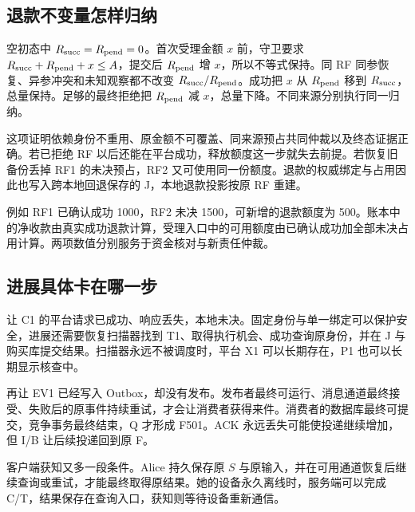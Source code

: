 \subsection*{退款不变量怎样归纳}

空初态中 $R_{\rm succ}=R_{\rm pend}=0$。首次受理金额 $x$ 前，守卫要求 $R_{\rm succ}+R_{\rm pend}+x\le A$，提交后 $R_{\rm pend}$ 增 $x$，所以不等式保持。同 RF 同参恢复、异参冲突和未知观察都不改变 $R_{\rm succ}/R_{\rm pend}$。成功把 $x$ 从 $R_{\rm pend}$ 移到 $R_{\rm succ}$，总量保持。足够的最终拒绝把 $R_{\rm pend}$ 减 $x$，总量下降。不同来源分别执行同一归纳。

这项证明依赖身份不重用、原金额不可覆盖、同来源预占共同仲裁以及终态证据正确。若已拒绝 RF 以后还能在平台成功，释放额度这一步就失去前提。若恢复旧备份丢掉 RF1 的未决预占，RF2 又可使用同一份额度。退款的权威绑定与占用因此也写入跨本地回退保存的 J，本地退款投影按原 RF 重建。



例如 RF1 已确认成功 1000，RF2 未决 1500，可新增的退款额度为 500。账本中的净收款由真实成功退款计算，受理入口中的可用额度由已确认成功加全部未决占用计算。两项数值分别服务于资金核对与新责任仲裁。


\subsection*{进展具体卡在哪一步}

让 C1 的平台请求已成功、响应丢失，本地未决。固定身份与单一绑定可以保护安全，进展还需要恢复扫描器找到 T1、取得执行机会、成功查询原身份，并在 J 与购买库提交结果。扫描器永远不被调度时，平台 X1 可以长期存在，P1 也可以长期显示核查中。

再让 EV1 已经写入 Outbox，却没有发布。发布者最终可运行、消息通道最终接受、失败后的原事件持续重试，才会让消费者获得来件。消费者的数据库最终可提交，竞争事务最终结束，Q 才形成 F501。ACK 永远丢失可能使投递继续增加，但 I/B 让后续投递回到原 F。

客户端获知又多一段条件。Alice 持久保存原 $S$ 与原输入，并在可用通道恢复后继续查询或重试，才能最终取得原结果。她的设备永久离线时，服务端可以完成 C/T，结果保存在查询入口，获知则等待设备重新通信。


